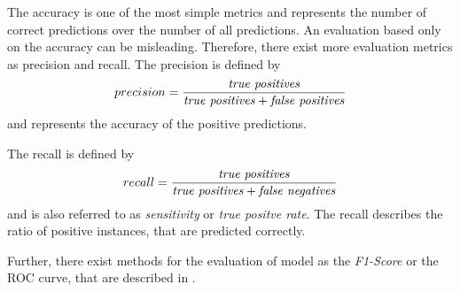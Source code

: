 The accuracy is one of the most simple metrics and represents the number of correct predictions over the number of all predictions.
An evaluation based only on the accuracy can be misleading.
Therefore, there exist more evaluation metrics as precision and recall.
The precision is defined by
\begin{equation}
	precision = \frac{\textnormal{\textit{true positives}}}{\textnormal{\textit{true positives}} + \textnormal{\textit{false positives}}}
\end{equation}
and represents the accuracy of the positive predictions.

The recall is defined by
\begin{equation}
	recall = \frac{\textnormal{\textit{true positives}}}{\textnormal{\textit{true positives}} + \textnormal{\textit{false negatives}}}
\end{equation}
and is also referred to as \textit{sensitivity} or \textit{true positve rate}.
The recall describes the ratio of positive instances, that are predicted correctly.

Further, there exist methods for the evaluation of model as the \textit{F1-Score} or the ROC curve, that are described in \cite{Ger17-HandsOn}.